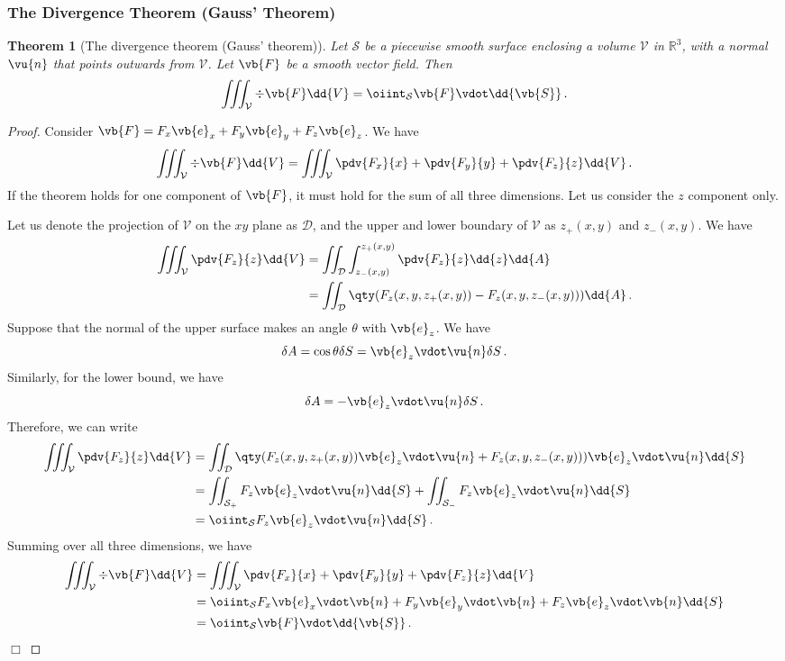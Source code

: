 \documentclass{article}
\theoremstyle{plain}\theoremheaderfont{\normalfont\itshape}\theorembodyfont{\rmfamily}\theoremseparator{.}\newtheorem*{rem}{Remark}\newtheorem*{ex}{Example}\newtheorem*{proof}{Proof}\newtheorem*{altp}{Alternative proof}
\theoremstyle{plain}\theoremheaderfont{\normalfont\bfseries}\theorembodyfont{\rmfamily}\theoremseparator{.}\newtheorem{thm}{Theorem}[section]\newtheorem{lem}[thm]{Lemma}\newtheorem{prop}[thm]{Proposition}\newtheorem*{cor}{Corollary}\newtheorem{defn}[thm]{Definition}\newtheorem{clm}[thm]{Claim}\newtheorem{clminproof}{Claim}
\theoremstyle{break}\theoremheaderfont{\normalfont\itshape}\theorembodyfont{\rmfamily}\theoremseparator{.\medskip}\newtheorem*{proofskip}{Proof}\newtheorem*{exs}{Examples}\newtheorem*{rems}{Remarks}
\theoremstyle{break}\theoremheaderfont{\normalfont\bfseries}\theorembodyfont{\rmfamily}\theoremseparator{.\medskip}\newtheorem{lemskip}[thm]{Lemma}\newtheorem{defnskip}[thm]{Definition}\newtheorem{propskip}[thm]{Proposition}\newtheorem{thmskip}[thm]{Theorem}
\numberwithin{equation}{section}
\newcommand{\qed}{\hfill\ensuremath{\Box}}
\begin{document}
	\subsubsection{The Divergence Theorem (Gauss' Theorem)}
	\begin{thm}[The divergence theorem (Gauss' theorem)]\label{divthm}
		Let \(\mathcal{S}\) be a piecewise smooth surface enclosing a volume \(\mathcal{V}\) in \(\mathbb{R}^3\), with a normal \(\vu{n}\) that points outwards from \(\mathcal{V}\). Let \(\vb{F}\) be a smooth vector field. Then
		\[\iiint_{\mathcal{V}}\div{\vb{F}}\dd{V}=\oiint_{\mathcal{S}}\vb{F}\vdot\dd{\vb{S}}\,.\]
	\end{thm}
	\begin{proof}
		Consider \(\vb{F}=F_x\vb{e}_x+F_y\vb{e}_y+F_z\vb{e}_z\). We have
		\[\iiint_\mathcal{V}\div\vb{F}\dd{V}=\iiint_\mathcal{V}\pdv{F_x}{x}+\pdv{F_y}{y}+\pdv{F_z}{z}\dd{V}\,.\]
		If the theorem holds for one component of \(\vb{F}\), it must hold for the sum of all three dimensions. Let us consider the \(z\) component only.

		Let us denote the projection of \(\mathcal{V}\) on the \(xy\) plane as \(\mathcal{D}\), and the upper and lower boundary of \(\mathcal{V}\) as \(z_+(x,y)\) and \(z_-(x,y)\). We have
		\begin{align*}
			\iiint_\mathcal{V}\pdv{F_z}{z}\dd{V}&=\iint_\mathcal{D}\int_{z_-(x,y)}^{z_+(x,y)}\pdv{F_z}{z}\dd{z}\dd{A}\\
			&=\iint_\mathcal{D}\qty(F_z(x,y,z_+(x,y))-F_z(x,y,z_-(x,y)))\dd{A}\,.
		\end{align*}
		Suppose that the normal of the upper surface makes an angle \(\theta\) with \(\vb{e}_z\). We have
		\[\delta A=\cos\theta\delta S=\vb{e}_z\vdot\vu{n}\delta S\,.\]
		Similarly, for the lower bound, we have
		\[\delta A=-\vb{e}_z\vdot\vu{n}\delta S\,.\]
		Therefore, we can write
		\begin{align*}
			\iiint_\mathcal{V}\pdv{F_z}{z}\dd{V}&=\iint_\mathcal{D}\qty(F_z(x,y,z_+(x,y))\vb{e}_z\vdot\vu{n}+F_z(x,y,z_-(x,y)))\vb{e}_z\vdot\vu{n}\dd{S}\\
			&=\iint_{\mathcal{S}_+}F_z\vb{e}_z\vdot\vu{n}\dd{S}+\iint_{\mathcal{S}_-}F_z\vb{e}_z\vdot\vu{n}\dd{S}\\
			&=\oiint_\mathcal{S}F_z\vb{e}_z\vdot\vu{n}\dd{S}\,.
		\end{align*}
		Summing over all three dimensions, we have
		\begin{align*}
			\iiint_\mathcal{V}\div\vb{F}\dd{V}&=\iiint_\mathcal{V}\pdv{F_x}{x}+\pdv{F_y}{y}+\pdv{F_z}{z}\dd{V}\\
			&=\oiint_\mathcal{S}F_x\vb{e}_x\vdot\vb{n}+F_y\vb{e}_y\vdot\vb{n}+F_z\vb{e}_z\vdot\vb{n}\dd{S}\\
			&=\oiint_\mathcal{S}\vb{F}\vdot\dd{\vb{S}}\,.
		\end{align*}\qed
	\end{proof}
	
\end{document}
